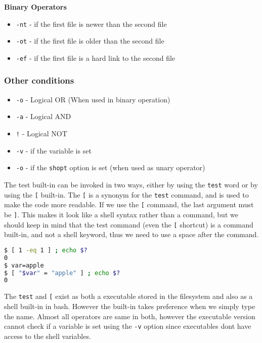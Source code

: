 \textbf{Binary Operators}

\begin{itemize}
    \item \lstinline|-nt| - if the first file is newer than the second file
    \item \lstinline|-ot| - if the first file is older than the second file
    \item \lstinline|-ef| - if the first file is a hard link to the second file
\end{itemize}

\subsubsection{Other conditions}

\begin{itemize}
  \item \lstinline|-o| - Logical OR (When used in binary operation)
  \item \lstinline|-a| - Logical AND
  \item \lstinline|!| - Logical NOT
  \item \lstinline|-v| - if the variable is set
  \item \lstinline|-o| - if the \lstinline|shopt| option is set (when used as unary operator)
\end{itemize}

The test built-in can be invoked in two ways, either by using the \lstinline{test} word or by using the \lstinline{[} built-in. The \lstinline{[} is a synonym for the \lstinline{test} command, and is used to make the code more readable.
If we use the \lstinline{[} command, the last argument must be \lstinline{]}. This makes it look like a shell syntax rather than a command, but we should keep in mind that the test command (even the \lstinline|[| shortcut) is a command built-in, and not a shell keyword, thus we need to use a space after the command.

\begin{lstlisting}[language=bash]
$ [ 1 -eq 1 ] ; echo $?
0
$ var=apple
$ [ "$var" = "apple" ] ; echo $?
0
\end{lstlisting}

\begin{remark}
  The \lstinline|test| and \lstinline|[| exist as both a executable stored in the filesystem and also as a shell built-in in bash. However the built-in takes preference when we simply type the name. Almost all operators are same in both, however the executable version cannot check if a variable is set using the \lstinline|-v| option since executables dont have access to the shell variables.
\end{remark}

